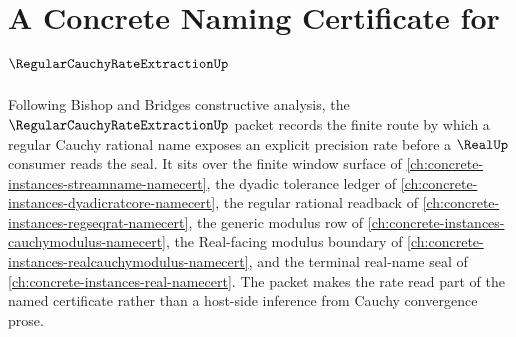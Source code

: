 \chapter{A Concrete Naming Certificate for $\RegularCauchyRateExtractionUp$}
\label{ch:concrete-instances-regular-cauchy-rate-extraction-namecert}

Following Bishop and Bridges constructive analysis, the $\RegularCauchyRateExtractionUp$ packet records the finite route by which a regular Cauchy rational name exposes an explicit precision rate before a $\RealUp$ consumer reads the seal. It sits over the finite window surface of \autoref{ch:concrete-instances-streamname-namecert}, the dyadic tolerance ledger of \autoref{ch:concrete-instances-dyadicratcore-namecert}, the regular rational readback of \autoref{ch:concrete-instances-regseqrat-namecert}, the generic modulus row of \autoref{ch:concrete-instances-cauchymodulus-namecert}, the Real-facing modulus boundary of \autoref{ch:concrete-instances-realcauchymodulus-namecert}, and the terminal real-name seal of \autoref{ch:concrete-instances-real-namecert}. The packet makes the rate read part of the named certificate rather than a host-side inference from Cauchy convergence prose.

